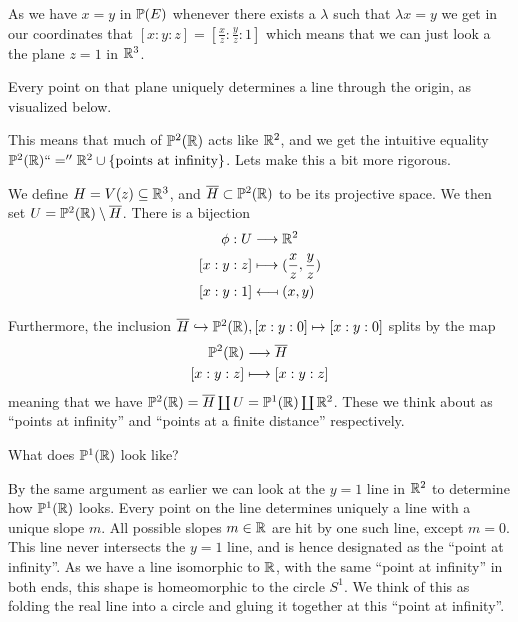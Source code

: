 As we have $x=y$ in $\P(E)$ whenever there exists a $\lambda$ such that $\lambda x = y$ we get in our coordinates that $[x:y:z] = [\frac{x}{z}:\frac{y}{z}:1]$ which means that we can just look a the plane $z=1$ in $\R^3$. 

Every point on that plane uniquely determines a line through the origin, as visualized below. 

\begin{center}
\def\svgwidth{0.4\textwidth}

\end{center}

This means that much of $\P^2(\R)$ acts like $\R^2$, and we get the intuitive equality $\P^2(\R) ``='' \R^2 \cup \{ \text{points at infinity}\}$. Lets make this a bit more rigorous. 

We define $H=V(z)\subseteq \R^3$, and $\overline{H}\subset \P^2(\R)$ to be its projective space. We then set $U=\P^2(\R)\setminus \overline{H}$. There is a bijection 
\begin{align*}
    \phi: U&\longrightarrow \R^2 \\
    [x:y:z]&\longmapsto (\frac{x}{z}, \frac{y}{z}) \\
    [x:y:1]&\longmapsfrom (x, y)
\end{align*}

Furthermore, the inclusion $\overline{H}\hookrightarrow \P^2(\R), [x:y:0]\mapsto [x:y:0]$ splits by the map
\begin{align*}
    \P^2(\R)&\longrightarrow \overline{H} \\
    [x:y:z]&\longmapsto [x:y:z]
\end{align*}
meaning that we have $\P^2(\R)= \overline{H}\coprod U = \P^1(\R)\coprod \R^2$. These we think about as ``points at infinity'' and ``points at a finite distance'' respectively. 

\begin{problem}
     What does $\P^1(\R)$ look like?

\begin{solution}
By the same argument as earlier we can look at the $y=1$ line in $\R^2$ to determine how $\P^1(\R)$ looks. Every point on the line determines uniquely a line with a unique slope $m$. All possible slopes $m\in \R$ are hit by one such line, except $m=0$. This line never intersects the $y=1$ line, and is hence designated as the ``point at infinity''. As we have a line isomorphic to $\R$, with the same ``point at infinity'' in both ends, this shape is homeomorphic to the circle $S^1$. We think of this as folding the real line into a circle and gluing it together at this ``point at infinity''.
\end{solution}
\end{problem}

